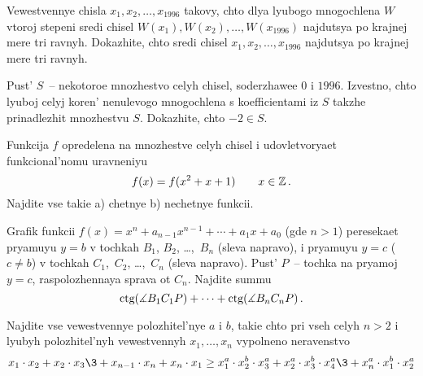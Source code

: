 \prob  %
Vewestvennye chisla             $x_{1},x_{2},\ldots ,x_{1996}$         
takovy, chto dlya lyubogo mnogochlena                  
                   $W$ vtoroj stepeni sredi chisel
%                               
$W(x_{1}),W(x_{2}),\ldots ,W(x_{1996})$ najdut${}$sya po krajnej
mere tri ravnyh. Dokazhite, chto
sredi chisel                          
               $x_{1},x_{2},\ldots ,x_{1996}$           
najdut${}$sya
po krajnej mere tri ravnyh.


\prob  %
Pust'     $S$~-- nekotoroe mnozhestvo celyh chisel, soderzhawee $0$ i
$1996$.
Izvestno, chto lyuboj celyj koren' nenulevogo mnogochlena s 
koefficientami iz                          
                       $S$ takzhe prinadlezhit mnozhestvu
                 $S$. Dokazhite, chto             $-2 \in S$.





\prob %
Funkcija $f$ opredelena na mnozhestve celyh chisel
i udovletvoryaet funkcional'\-nomu uravneniyu
                       $$f(x)=f(x^2+x+1) \qquad  x\in {\Bbb Z}\,.$$   
Najdite vse takie a) chetnye b) nechetnye  funkcii.                          
     
\def\ctg{\hbox{\rm ctg}}
\prob  %
Grafik funkcii         $f(x)=x^n+a_{n-1}x^{n-1}+\cdots+a_1x+a_0$       
(gde $n>1$) peresekaet pryamuyu                     
     $y=b$        v tochkah       $B_1$, $B_2$, \dots,~$B_n$ (sleva
napravo),
i pryamuyu    $y=c$ ($c\ne b$) v tochkah     $C_1$,~$C_2$, \dots,~$C_n$      
(sleva napravo).
Pust' $P$~-- tochka na pryamoj $y=c$, raspolozhennaya sprava ot
$C_n$. Najdite summu
$$
\ctg(\ang B_1C_1P)+\dots+\ctg(\ang B_nC_nP)\,.
$$



\prob   %
Najdite vse vewestvennye polozhitel'nye  $a$ i $b$, takie chto
pri vseh celyh $n>2$ i lyubyh polozhitel'nyh vewestvennyh
$x_1, \dots, x_n$
vypolneno neravenstvo                    
  $$x_1\cdot x_2+x_2\cdot x_3\3+x_{n-1}\cdot x_n+x_n\cdot x_1
    \ge x_1^a\cdot x_2^b\cdot x_3^a+x_2^a\cdot x_3^b\cdot 
        x_4^a\3+x_n^a\cdot x_1^b\cdot x_2^a$$



